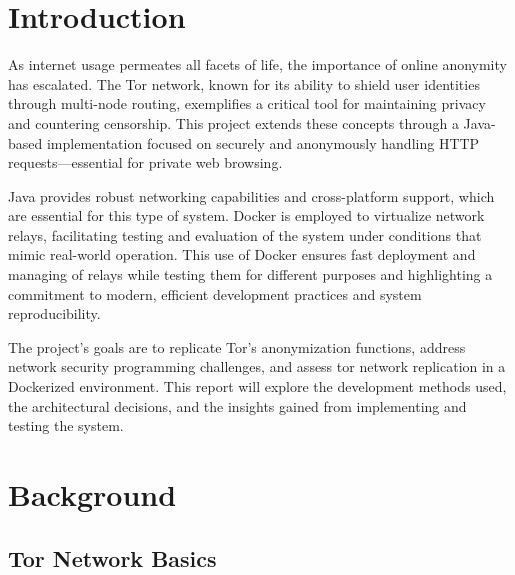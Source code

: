 \documentclass[sigconf]{acmart}
\begin{document}

\maketitle
\pagestyle{plain} %


\section{Introduction}
As internet usage permeates all facets of life, the importance of online anonymity has escalated. The Tor network, known for its ability to shield user identities through multi-node routing, exemplifies a critical tool for maintaining privacy and countering censorship. This project extends these concepts through a Java-based implementation focused on securely and anonymously handling HTTP requests—essential for private web browsing.

Java provides robust networking capabilities and cross-platform support, which are essential for this type of system. Docker is employed to virtualize network relays, facilitating testing and evaluation of the system under conditions that mimic real-world operation. This use of Docker ensures fast deployment and managing of relays while testing them for different purposes and highlighting a commitment to modern, efficient development practices and system reproducibility.

The project's goals are to replicate Tor’s anonymization functions, address network security programming challenges, and assess tor network replication in a Dockerized environment. This report will explore the development methods used, the architectural decisions, and the insights gained from implementing and testing the system.


\section{Background}

\subsection{Tor Network Basics}
\end{document}
